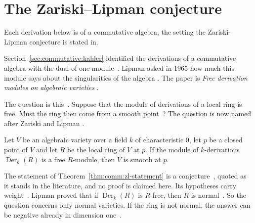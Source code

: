 \section{The Zariski--Lipman conjecture}\label{sec:commutative:zariski-lipman}

Each derivation below is of a commutative algebra, the setting the
Zariski-Lipman conjecture is stated in. %

Section~\ref{sec:commutative:kahler} identified the derivations of a
commutative algebra with the dual of one module~\cite[p.~270]{BiswasGurjarKolte2014}. Lipman asked in 1965 how much
this module says about the singularities of the algebra
\cite[p.~270]{BiswasGurjarKolte2014}. The paper is
\emph{Free derivation modules on algebraic varieties}
\cite[p.~270]{BiswasGurjarKolte2014}.

The question is this~\cite[p.~270]{BiswasGurjarKolte2014}. Suppose that the
module of derivations of a local ring is free. Must the ring then come from a
smooth point~\cite[p.~270]{BiswasGurjarKolte2014}? The question is now named
after Zariski and Lipman \cite[p.~270]{BiswasGurjarKolte2014}.

\begin{theorem}\label{thm:comm:zl-statement}
Let $V$ be an algebraic variety over a field $k$ of characteristic $0$, let
$p$ be a closed point of $V$ and let $R$ be the local ring of $V$ at $p$. If
the module of $k$-derivations $\operatorname{Der}_k(R)$ is a free $R$-module,
then $V$ is smooth at $p$.
\end{theorem}

The statement of Theorem~\ref{thm:comm:zl-statement} is a
conjecture~\cite[p.~270]{BiswasGurjarKolte2014}, quoted as it stands in the
literature, and no proof is claimed here. Its hypotheses carry
weight~\cite[p.~270]{BiswasGurjarKolte2014}. Lipman proved that if
$\operatorname{Der}_k(R)$ is $R$-free, then $R$ is
normal~\cite[p.~270]{BiswasGurjarKolte2014}. So the question concerns only
normal varieties. If the ring is not normal, the answer can be negative
already in dimension one~\cite[p.~270]{BiswasGurjarKolte2014}.

